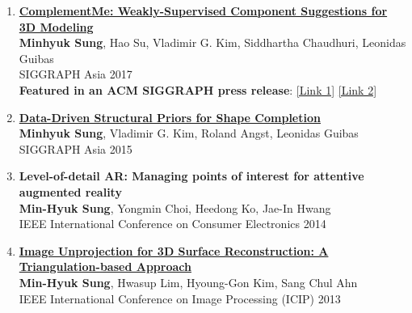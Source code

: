 \documentclass[letterpaper,10pt]{article} %
\newcommand{\blankline}{\quad\pagebreak[2]}
\begin{document}
\begin{enumerate}
\item \label{siggraphasia17}
\href{https://mhsung.github.io/complement-me.html}{\textbf{ComplementMe: Weakly-Supervised Component Suggestions for 3D Modeling}}\\
\textbf{Minhyuk Sung}, Hao Su, Vladimir G. Kim, Siddhartha Chaudhuri, Leonidas Guibas\\
SIGGRAPH Asia 2017\\
{\color{linkcolor}
\textbf{Featured in an ACM SIGGRAPH press release}:
\href{https://www.eurekalert.org/pub_releases/2017-11/afcm-sad120417.php}{[Link 1]}
\href{https://scienmag.com/simplifying-assembly-based-design-for-3-d-modeling/}{[Link 2]}
}\\
\blankline

\item \label{siggraphasia15}
\href{https://mhsung.github.io/structure-completion.html}{\textbf{Data-Driven Structural Priors for Shape Completion}}\\
\textbf{Minhyuk Sung}, Vladimir G. Kim, Roland Angst, Leonidas Guibas\\
SIGGRAPH Asia 2015\\
\blankline

\item \label{icce14}
\textbf{Level-of-detail AR: Managing points of interest for attentive augmented reality}\\
\textbf{Min-Hyuk Sung}, Yongmin Choi, Heedong Ko, Jae-In Hwang\\
IEEE International Conference on Consumer Electronics 2014\\
\blankline

\item \label{icip13}
\href{http://dx.doi.org/10.1109/icip.2013.6738034}{\textbf{Image Unprojection for 3D Surface Reconstruction: A Triangulation-based Approach}}\\
\textbf{Min-Hyuk Sung}, Hwasup Lim, Hyoung-Gon Kim, Sang Chul Ahn\\
IEEE International Conference on Image Processing (ICIP) 2013\\
\blankline


\end{enumerate}
\end{document}
